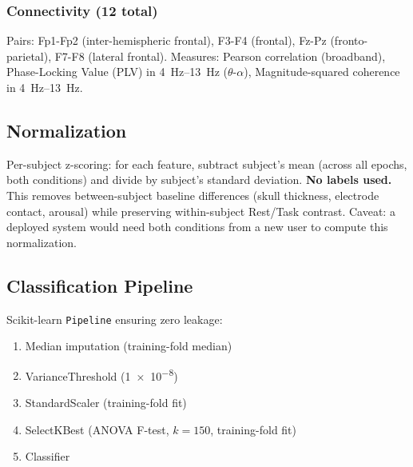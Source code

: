 \documentclass[conference]{IEEEtran}
\begin{document}
\subsubsection{Connectivity (\num{12} total)}
Pairs: Fp1-Fp2 (inter-hemispheric frontal), F3-F4 (frontal), Fz-Pz (fronto-parietal), F7-F8 (lateral frontal). Measures: Pearson correlation (broadband), Phase-Locking Value (PLV) \cite{lachaux1999measuring} in \SIrange{4}{13}{\hertz} ($\theta$-$\alpha$), Magnitude-squared coherence in \SIrange{4}{13}{\hertz}.

\subsection{Normalization}
\label{sec:normalize}
Per-subject z-scoring: for each feature, subtract subject's mean (across all epochs, both conditions) and divide by subject's standard deviation. \textbf{No labels used.} This removes between-subject baseline differences (skull thickness, electrode contact, arousal) while preserving within-subject Rest/Task contrast. Caveat: a deployed system would need both conditions from a new user to compute this normalization.

\subsection{Classification Pipeline}
\label{sec:pipeline}
Scikit-learn \texttt{Pipeline} ensuring zero leakage:
\begin{enumerate}
    \item Median imputation (training-fold median)
    \item VarianceThreshold (\num{1e-8})
    \item StandardScaler (training-fold fit)
    \item SelectKBest (ANOVA F-test, $k=150$, training-fold fit)
    \item Classifier
\end{enumerate}
\end{document}
